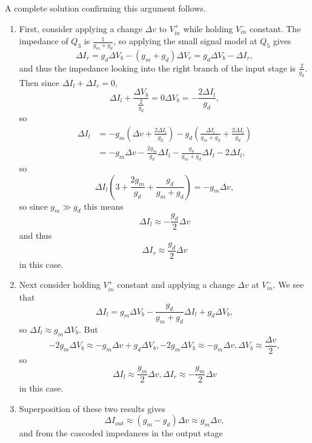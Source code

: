 \documentclass{article}
\begin{document}
\begin{enumerate}
{A complete solution confirming this argument follows.

\begin{enumerate}
  \item{First, consider applying a change $\Delta v$ to $V_{in}^+$ while 
        holding $V_{in}^-$ constant. The impedance of $Q_3$ is
        $\frac{1}{g_m + g_d}$, so applying the small signal model at
        $Q_5$ gives
        $$
        \Delta I_r = g_d \Delta V_b - (g_m + g_d) \Delta V_r 
                   = g_d \Delta V_b - \Delta I_r,
        $$
        and thus the impedance looking into the right branch of the input
        stage is $\frac{2}{g_d}$. Then since $\Delta I_l + \Delta I_r = 0$,
        $$
        \Delta I_l + \frac{\Delta V_b}{\frac{2}{g_d}} = 0
        \Delta V_b = -\frac{2 \Delta I_l}{g_d},
        $$
        so
        \begin{align*}
        \Delta I_l &= -g_m (\Delta v + \frac{2 \Delta I_l}{g_d}) 
                      -g_d (\frac{\Delta I_l}{g_m + g_d} 
                         +  \frac{2 \Delta I_l}{g_d}) \\
                   &= -g_m \Delta v - \frac{2 g_m}{g_d} \Delta I_l
                      -\frac{g_d}{g_m + g_d} \Delta I_l - 2 \Delta I_l,
        \end{align*}
        so
        $$
        \Delta I_l (3 + \frac{2 g_m}{g_d} + \frac{g_d}{g_m + g_d}) 
         = -g_m \Delta v,
        $$
        so since $g_m \gg g_d$ this means
        $$
        \Delta I_l \approx -\frac{g_d}{2} \Delta v
        $$
        and thus
        $$
        \Delta I_r \approx \frac{g_d}{2} \Delta v
        $$
        in this case.
       }
       \item{
         Next consider holding $V_{in}^+$ constant and
         applying a change $\Delta v$ at $V_{in}^-$. We see that
         $$
         \Delta I_l = g_m \Delta V_b - \frac{g_d}{g_m + g_d} \Delta I_l + g_d \Delta V_b,
         $$
         so $\Delta I_l \approx g_m \Delta V_b$. But
         $$
         -2 g_m \Delta V_b \approx -g_m \Delta v + g_d \Delta V_b,
         -2 g_m \Delta V_b \approx -g_m \Delta v,
         \Delta V_b \approx \frac{\Delta v}{2},
         $$
         so
         $$
         \Delta I_l \approx \frac{g_m}{2} \Delta v, \Delta I_r \approx -\frac{g_m}{2} \Delta v
         $$
         in this case.
       }
       \item{
         Superposition of these two results gives
         $$
         \Delta I_{out} \approx (g_m - g_d) \Delta v \approx g_m \Delta v,
         $$
         and from the cascoded impedances in the output stage
}
\end{enumerate}}
\end{enumerate}
\end{document}

